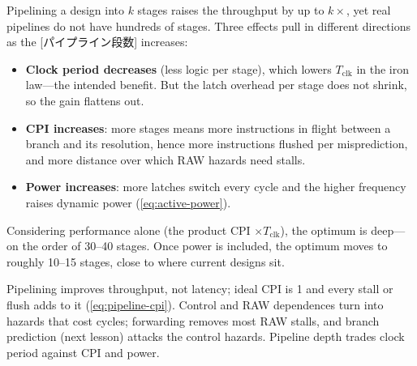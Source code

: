 \documentclass[../main.tex]{subfiles}
\begin{document}
Pipelining a design into $k$ stages raises the throughput by up to $k\times$,
yet real pipelines do not have hundreds of stages.
Three effects pull in different directions as the [パイプライン段数] increases:
\begin{itemize}
  \item \textbf{Clock period decreases} (less logic per stage), which
    lowers $T_{\mathrm{clk}}$ in the iron law---the intended benefit.  But
    the latch overhead per stage does not shrink, so the gain flattens
    out.
  \item \textbf{CPI increases}: more stages means more instructions in
    flight between a branch and its resolution, hence more instructions
    flushed per misprediction, and more distance over which RAW hazards
    need stalls.
  \item \textbf{Power increases}: more latches switch every cycle and the
    higher frequency raises dynamic power (\cref{eq:active-power}).
\end{itemize}

Considering performance alone (the product CPI $\times T_{\mathrm{clk}}$),
the optimum is deep---on the order of 30--40 stages.  Once power is
included, the optimum moves to roughly 10--15 stages, close to where
current designs sit.

\begin{keypoint}
  Pipelining improves throughput, not latency; ideal CPI is 1 and every stall
  or flush adds to it (\cref{eq:pipeline-cpi}).  Control and RAW dependences
  turn into hazards that cost cycles; forwarding removes most RAW stalls,
  and branch prediction (next lesson) attacks the control hazards.  Pipeline
  depth trades clock period against CPI and power.
\end{keypoint}
\end{document}
